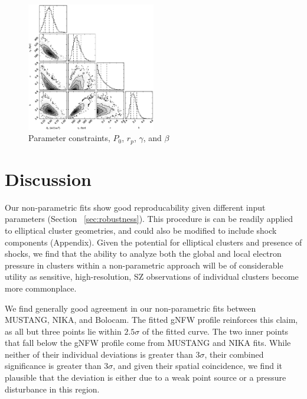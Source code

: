\documentclass[twocolumn,traditabstract]{aa}
\begin{document}
\begin{figure}[!h]
  \centering
  \includegraphics[width=0.5\textwidth]{NIKA_ml_deproj_figs/Real_Joint_gNFW_Real_11011111_2500S_500B_100W_contour.eps}
  \caption{Parameter constraints, $P_0$, $r_p$, $\gamma$, and $\beta$}
  \label{fig:joint_constraints}
\end{figure}

\section{Discussion}
\label{sec:discussion}

Our non-parametric fits show good reproducability given different input parameters (Section ~\ref{sec:robustness}).
This procedure is can be readily applied to elliptical cluster geometries, and could also be modified
to include shock components (Appendix). Given the potential for elliptical clusters and presence of shocks,
we find that the ability to analyze both the global and local electron pressure in clusters within a
non-parametric approach will be of considerable utility as sensitive, high-resolution,
SZ observations of individual clusters become more commonplace.

We find generally good agreement in our non-parametric fits
between MUSTANG, NIKA, and Bolocam. The fitted gNFW profile reinforces this claim, as all but three points
lie within $2.5\sigma$ of the fitted curve. The two inner points that fall below the gNFW profile come from
MUSTANG and NIKA fits. While neither of their individual deviations is greater than $3\sigma$, their combined
significance is greater than $3\sigma$, and given their spatial coincidence, we find it plausible that the
deviation is either due to a weak point source or a pressure disturbance in this region.
\end{document}
